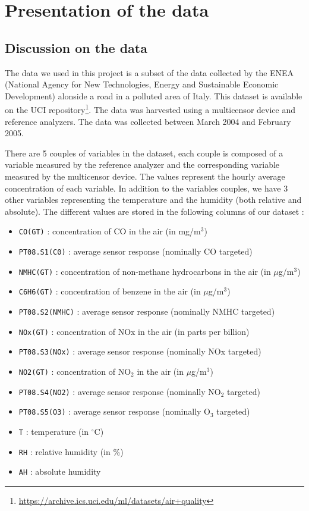 \section{Presentation of the data}

\subsection{Discussion on the data}
The data we used in this project is a subset of the data collected by the ENEA (National Agency for New Technologies, Energy and Sustainable Economic Development)
alonside a road in a polluted area of Italy. This dataset is available on the UCI repository\footnote{\href{https://archive.ics.uci.edu/ml/datasets/air+quality}{https://archive.ics.uci.edu/ml/datasets/air+quality}}. The data was harvested using a multicensor device and reference analyzers. The data was collected between March 2004 and February 2005.

There are 5 couples of variables in the dataset, each couple is composed of a variable measured by the reference analyzer and the corresponding variable measured by the multicensor device.
The values represent the hourly average concentration of each variable. In addition to the variables couples, we have 3 other variables representing the temperature and the humidity (both relative and absolute).
The different values are stored in the following columns of our dataset :
\begin{itemize}
\item \texttt{CO(GT)} : concentration of CO in the air (in mg/m$^3$)
\item \texttt{PT08.S1(C0)} : average sensor response (nominally CO targeted)
\item \texttt{NMHC(GT)} : concentration of non-methane hydrocarbons in the air (in $\mu$g/m$^3$)
\item \texttt{C6H6(GT)} : concentration of benzene in the air (in $\mu$g/m$^3$)
\item \texttt{PT08.S2(NMHC)} : average sensor response (nominally NMHC targeted)
\item \texttt{NOx(GT)} : concentration of NOx in the air (in parts per billion)
\item \texttt{PT08.S3(NOx)} : average sensor response (nominally NOx targeted)
\item \texttt{NO2(GT)} : concentration of NO$_2$ in the air (in $\mu$g/m$^3$)
\item \texttt{PT08.S4(NO2)} : average sensor response (nominally NO$_2$ targeted)
\item \texttt{PT08.S5(O3)} : average sensor response (nominally O$_3$ targeted)
\item \texttt{T} : temperature (in $^{\circ}$C)
\item \texttt{RH} : relative humidity (in $\%$)
\item \texttt{AH} : absolute humidity
\end{itemize}


